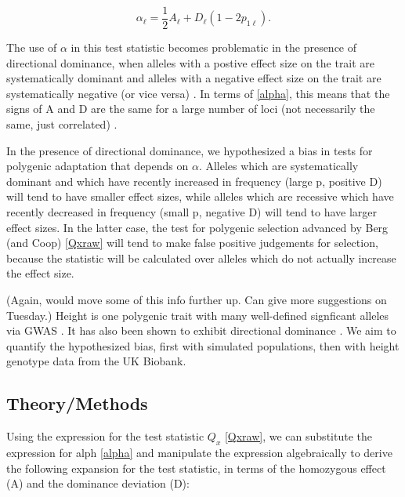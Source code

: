 \documentclass[a4paper,11pt]{article}
\newcommand{\jb}[1]{{\color{blue} (#1)} }
\begin{document}
\begin{equation}  
  \alpha_\ell = \frac{1}{2} A_\ell + D_\ell\left(1-2p_{1\ell}\right).
  \label{alpha}
\end{equation}

The use of $\alpha$ in this test statistic becomes problematic in the
presence of directional dominance, when alleles with a postive effect
size on the trait are systematically dominant and alleles with a
negative effect size on the trait are systematically negative \jb{or vice versa}. In
terms of \eqref{alpha}, this means that the signs of A and D are the
same for a large number of loci \jb{not necessarily the same, just correlated}.

In the presence of directional dominance, we hypothesized a bias in
tests for polygenic adaptation that depends on $\alpha$. Alleles which
are systematically dominant and which have recently increased in
frequency (large p, positive D) will tend to have smaller effect sizes, while
alleles which are recessive which have recently decreased in frequency
(small p, negative D) will tend to have larger effect sizes. In the
latter case, the test for polygenic selection advanced by Berg \jb{and Coop}
\eqref{Qxraw} will tend to make false positive judgements for
selection, because the statistic will be calculated over alleles which
do not actually increase the effect size.


\jb{Again, would move some of this info further up. Can give more suggestions on Tuesday.}
Height is one polygenic trait with many well-defined signficant
alleles via GWAS \cite{heightselection}. It has also been shown to exhibit
directional dominance \cite{heightdirectdom}. We aim to quantify the
hypothesized bias, first with simulated populations, then with height genotype data from the UK Biobank.



\subsection*{Theory/Methods}

Using the expression for the test statistic $Q_x$ \eqref{Qxraw}, we
can substitute the expression for alph \eqref{alpha} and manipulate
the expression algebraically to derive the following expansion for the
test statistic, in terms of the homozygous effect (A)  and the dominance
deviation (D):
\end{document}

